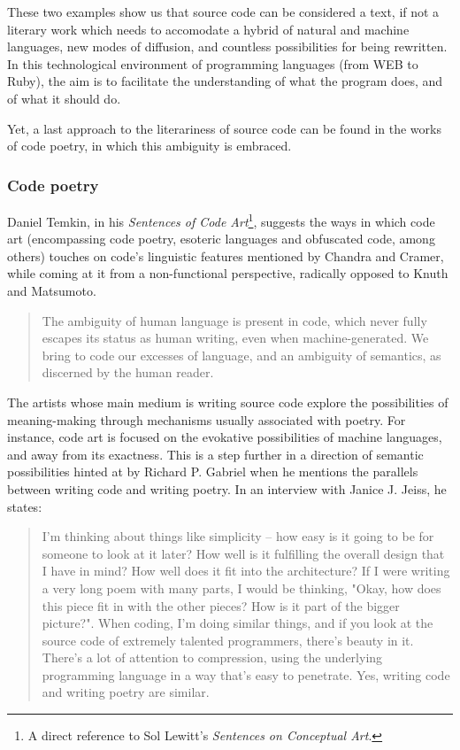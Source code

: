 These two examples show us that source code can be considered a text, if not a literary work which needs to accomodate a hybrid of natural and machine languages, new modes of diffusion, and countless possibilities for being rewritten. In this technological environment of programming languages (from WEB to Ruby), the aim is to facilitate the understanding of what the program does, and of what it should do.

Yet, a last approach to the literariness of source code can be found in the works of code poetry, in which this ambiguity is embraced.

\subsubsection{Code poetry}

Daniel Temkin, in his \emph{Sentences of Code Art}\footnote{A direct reference to Sol Lewitt's \emph{Sentences on Conceptual Art}.}, suggests the ways in which code art (encompassing code poetry, esoteric languages and obfuscated code, among others) touches on code's linguistic features mentioned by Chandra and Cramer, while coming at it from a non-functional perspective, radically opposed to Knuth and Matsumoto.

\begin{quote}
  The ambiguity of human language is present in code, which never fully escapes its status as human writing, even when machine-generated. We bring to code our excesses of language, and an ambiguity of semantics, as discerned by the human reader.\cite{temkin_sentences_2017}
\end{quote}

The artists whose main medium is writing source code explore the possibilities of meaning-making through mechanisms usually associated with poetry. For instance, code art is focused on the evokative possibilities of machine languages, and away from its exactness. This is a step further in a direction of semantic possibilities hinted at by Richard P. Gabriel when he mentions the parallels between writing code and writing poetry. In an interview with Janice J. Jeiss, he states:

\begin{quote}
  I'm thinking about things like simplicity -- how easy is it going to be for someone to look at it later? How well is it fulfilling the overall design that I have in mind? How well does it fit into the architecture? If I were writing a very long poem with many parts, I would be thinking, "Okay, how does this piece fit in with the other pieces? How is it part of the bigger picture?". When coding, I'm doing similar things, and if you look at the source code of extremely talented programmers, there's beauty in it. There's a lot of attention to compression, using the underlying programming language in a way that's easy to penetrate. Yes, writing code and writing poetry are similar. \cite{jeiss_poetry_2002}
\end{quote}

